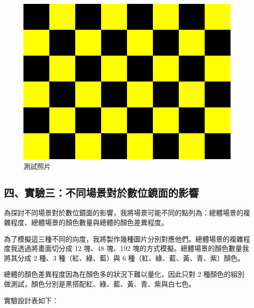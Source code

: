 \documentclass[12pt]{article}
\begin{document}
\begin{figure}[htbp]
\begin{minipage}[b]{0.3\textwidth}
    \centering
    \includegraphics[width=\textwidth]{img/blank_Yellow.png}
  \end{minipage}
  \caption{測試照片}\label{fig:test_img1}
\end{figure}

\newpage

\subsection{四、實驗三：不同場景對於數位鏡面的影響}

為探討不同場景對於數位鏡面的影響，我將場景可能不同的點列為：總體場景的複雜程度、總體場景的顏色數量與總體的顏色差異程度。

為了模擬這三種不同的向度，我將製作幾種圖片分別對應他們。總體場景的複雜程度我透過將畫面切分成 12 塊、48 塊、192 塊的方式模擬。總體場景的顏色數量我將其分成 2 種、3 種（紅、綠、藍）與 6 種（紅、綠、藍、黃、青、紫）顏色。

總體的顏色差異程度因為在顏色多的狀況下難以量化，因此只對 2 種顏色的組別做測試，顏色分別是黑搭配紅、綠、藍、黃、青、紫與白七色。

實驗設計表如下：
\end{document}
